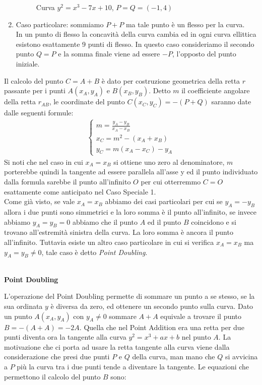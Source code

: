\documentclass[a4paper,12pt]{tesiinfo}
\newcommand\ddfrac[2]{\frac{\displaystyle #1}{\displaystyle #2}}
\begin{document}
\begin{enumerate}
\begin{figure}[H]
        \caption{Curva $y^2 = x^3-7x+10$, $P=Q=(-1, 4)$}
    \end{figure}
    \item Caso particolare: sommiamo $P+P$ ma tale punto \`e un flesso per la curva. 
    \\
    In un punto di flesso la concavit\`a della curva cambia ed in ogni curva ellittica esistono esattamente 9 punti di flesso. In questo caso consideriamo il secondo punto $Q =P$ e la somma finale viene ad essere $-P$, l'opposto del punto iniziale.
\end{enumerate}
Il calcolo del punto $C = A + B$ \`e dato per costruzione geometrica della retta $r$ passante per i punti $A(x_A, y_A)$ e $B(x_B, y_B)$. Detto $m$ il coefficiente angolare della retta $r_{AB}$, le coordinate del punto $C(x_C, y_C) = -(P+Q)$ saranno date dalle seguenti formule:
\begin{align*}
\begin{cases}
m = \ddfrac{y_A - y_B}{x_A - x_B}\\
x_C = m^2 - (x_A + x_B)\\
y_C = m(x_A - x_C)-y_A
\end{cases}
\end{align*}
Si noti che nel caso in cui $x_A = x_B$ si ottiene uno zero al denominatore, $m$ porterebbe quindi la tangente ad essere parallela all'asse y ed il punto individuato dalla formula sarebbe il punto all'infinito $O$ per cui otterremmo $C = O$ esattamente come anticipato nel Caso Speciale 1.
\\
Come gi\`a visto, se vale $x_A = x_B$ abbiamo dei casi particolari per cui se $y_A = -y_B$ allora i due punti sono simmetrici e la loro somma \`e il punto all'infinito, se invece abbiamo $y_A = y_B = 0$ abbiamo che il punto $A$ ed il punto $B$ coincidono e si trovano all'estremit\`a sinistra della curva. La loro somma \`e ancora il punto all'infinito. Tuttavia esiste un altro caso particolare in cui si verifica $x_A = x_B$ ma $y_A = y_B \ne 0$, tale caso \`e detto \textit{Point Doubling}.
\\
\\
\begin{center}
\textbf{Point Doubling}
\end{center}
L'operazione del Point Doubling permette di sommare un punto a se stesso, se la sua ordinata $y$ \`e diversa da zero, ed ottenere un secondo punto sulla curva. Dato un punto $A(x_A, y_A)$ con $y_A \ne 0$ sommare $A+A$ equivale a trovare il punto $B = -(A+A) = -2A$. Quella che nel Point Addition era una retta per due punti diventa ora la tangente alla curva $y^2 = x^3 + ax +b$ nel punto $A$. La motivazione che ci porta ad usare la retta tangente alla curva viene dalla considerazione che presi due punti $P$ e $Q$ della curva, man mano che $Q$ si avvicina a $P$ pi\`u la curva tra i due punti tende a diventare la tangente. Le equazioni che permettono il calcolo del punto $B$ sono:
\end{document}
